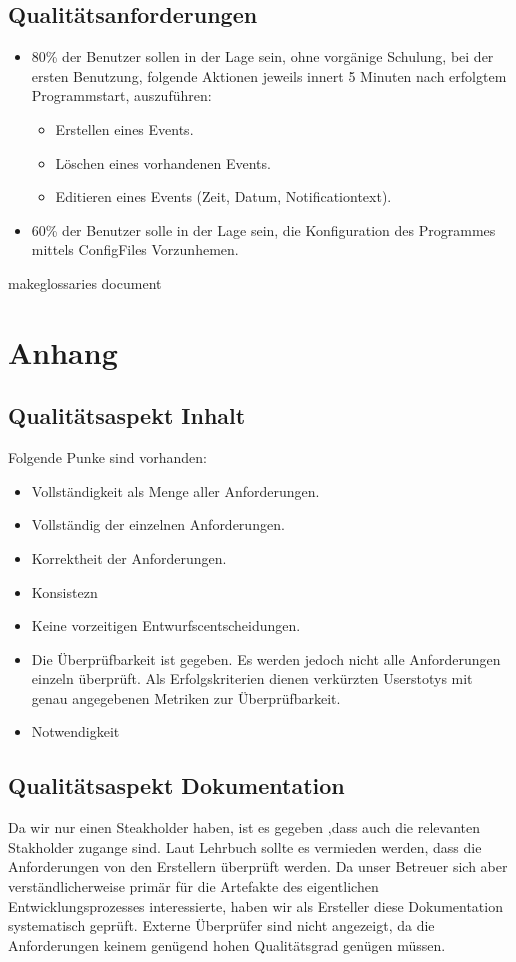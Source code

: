 \documentclass[11pt,titelpage]{scrartcl}
\begin{document}
\subsection{Qualitätsanforderungen}
\begin{itemize}
\item 80\% der Benutzer sollen in der Lage sein, ohne vorgänige Schulung, bei der ersten Benutzung, folgende Aktionen
jeweils innert 5 Minuten nach erfolgtem Programmstart, auszuführen:
\begin{itemize}
\item Erstellen eines Events.
\item Löschen eines vorhandenen Events.
\item Editieren eines Events (Zeit, Datum, Notificationtext).
\end{itemize}

\item 60\% der Benutzer solle in der Lage sein, die Konfiguration des Programmes mittels ConfigFiles Vorzunhemen.
\end{itemize}makeglossaries document

\section{Anhang}
\listoffigures
\listoftables
\glsaddall
\printglossary

\glsaddall
\printglossary
\subsection{Qualitätsaspekt Inhalt}
Folgende Punke sind vorhanden:
\begin{itemize}
 \item Vollständigkeit als Menge aller Anforderungen.
 \item Vollständig der einzelnen Anforderungen.
 \item Korrektheit der Anforderungen.
 \item Konsistezn
 \item Keine vorzeitigen Entwurfscentscheidungen.
 \item Die Überprüfbarkeit ist gegeben. Es werden jedoch nicht alle Anforderungen einzeln überprüft. Als Erfolgskriterien dienen verkürzten Userstotys mit genau angegebenen Metriken zur Überprüfbarkeit.
 \item Notwendigkeit
\end{itemize}
\subsection{Qualitätsaspekt Dokumentation}
Da wir nur einen Steakholder haben, ist es gegeben ,dass auch die relevanten Stakholder zugange sind. Laut Lehrbuch sollte es vermieden werden, dass die Anforderungen von den Erstellern überprüft werden. Da unser Betreuer sich aber verständlicherweise primär für die Artefakte des eigentlichen Entwicklungsprozesses interessierte, haben wir als Ersteller diese Dokumentation systematisch geprüft. Externe Überprüfer sind nicht angezeigt, da die Anforderungen keinem genügend hohen Qualitätsgrad genügen müssen.
\end{document}
